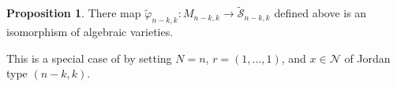 \documentclass[11pt,reqno]{amsart}
\numberwithin{equation}{section}
\theoremstyle{definition}
\newtheorem{prop}[theorem]{Proposition}
\newcommand{\cN}{\mathcal{N}}
\newcommand{\cS}{\mathcal{S}}
\newcommand{\tcS}{\widetilde{\cS}}
\newcommand{\tphi}{\widetilde{\varphi}}
\begin{document}



 

\begin{prop} \label{prop:MS2}
There map $\tphi_{n-k,k}: M_{n-k,k} \to \tcS_{n-k,k}$ defined above is an isomorphism of algebraic varieties.
\end{prop}
 \proof
 This is a special case of \cite[Thm. 8]{Maf05} by setting $N = n$, $r = (1, \ldots, 1)$, and $x\in\cN$ of Jordan type $(n-k,k)$.  
 \endproof


\end{document}
